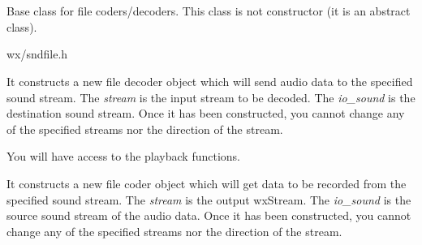 \section{}\label{wxsoundfilestream}

Base class for file coders/decoders. This class is not constructor (it is an abstract
class).




wx/sndfile.h



\label{wxsoundfilestreamwxsoundfilestream}


It constructs a new file decoder object which will send 
audio data to the specified sound stream. 
The {\it stream} is the input stream to be decoded. The
{\it io_sound} is the destination sound stream.
Once it has been constructed, you cannot change any of
the specified streams nor the direction of the stream.

You will have access to the playback functions.


It constructs a new file coder object which will get
data to be recorded from the specified sound stream.
The {\it stream} is the output wxStream. The {\it io_sound}
is the source sound stream of the audio data. Once
it has been constructed, you cannot change any of
the specified streams nor the direction of the stream.

\label{wxsoundfilestreamdtor}

